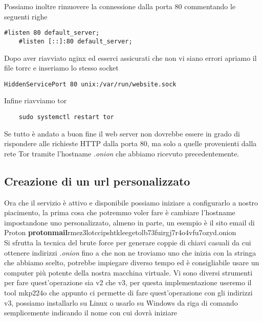 Possiamo inoltre rimuovere la connessione dalla porta 80 commentando le seguenti righe
\begin{lstlisting}[caption={Rimozione connessione dalla porta 80}]
    #listen 80 default_server;
    #listen [::]:80 default_server;
\end{lstlisting}



Dopo aver riavviato nginx ed esserci assicurati che non vi siano errori apriamo il file torrc e inseriamo lo stesso socket
\begin{lstlisting}[caption={Aggiunta socket unix a torrc}]
    HiddenServicePort 80 unix:/var/run/website.sock
\end{lstlisting}

Infine riavviamo tor
\begin{lstlisting}
    sudo systemctl restart tor
\end{lstlisting}
Se tutto è andato a buon fine il web server non dovrebbe essere in grado di rispondere alle richieste HTTP dalla porta 80, ma solo a quelle provenienti dalla rete Tor tramite l'hostname \emph{.onion} che abbiamo ricevuto precedentemente. \\

\newpage
\subsection{Creazione di un url personalizzato}
Ora che il servizio è attivo e disponibile possiamo iniziare a configurarlo a nostro piacimento, la prima cosa che potremmo voler fare è cambiare l'hostname impostandone uno personalizzato, almeno in parte, un esempio è il sito email di Proton \textbf{protonmail}rmez3lotccipshtkleegetolb73fuirgj7r4o4vfu7ozyd.onion \\
Si sfrutta la tecnica del brute force per generare coppie di chiavi casuali da cui ottenere indirizzi \emph{.onion} fino a che non ne troviamo uno che inizia con la stringa che abbiamo scelto, potrebbe impiegare diverso tempo ed è consigliabile usare un computer più potente della nostra macchina virtuale. 
Vi sono diversi strumenti per fare quest'operazione sia v2 che v3, per questa implementazione useremo il tool mkp224o \cite{V3AddressGeneratorRepo} che appunto ci permette di fare quest'operazione con gli indirizzi v3, possiamo installarlo su Linux o usarlo su Windows da riga di comando semplicemente indicando il nome con cui dovrà iniziare

